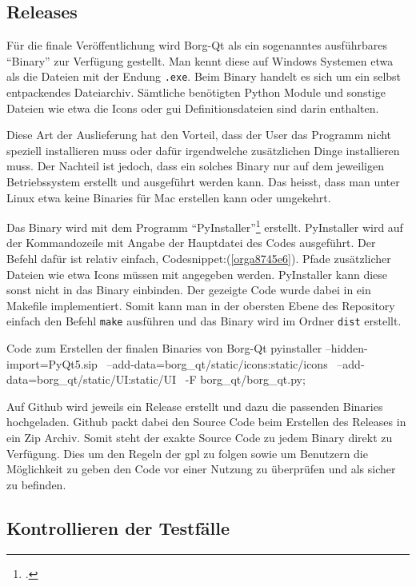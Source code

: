\newpage
\subsection{Releases}
\label{sec:org3adb3b3}

Für die finale Veröffentlichung wird Borg-Qt als ein sogenanntes ausführbares
"`Binary"' zur Verfügung gestellt. Man kennt diese auf Windows Systemen etwa als
die Dateien mit der Endung \texttt{.exe}. Beim Binary handelt es sich um ein selbst
entpackendes Dateiarchiv. Sämtliche benötigten Python Module und sonstige
Dateien wie etwa die Icons oder \gls{gui} Definitionsdateien sind darin
enthalten.

Diese Art der Auslieferung hat den Vorteil, dass der User das Programm nicht
speziell installieren muss oder dafür irgendwelche zusätzlichen Dinge
installieren muss. Der Nachteil ist jedoch, dass ein solches Binary nur auf dem
jeweiligen Betriebssystem erstellt und ausgeführt werden kann. Das heisst, dass
man unter Linux etwa keine Binaries für Mac erstellen kann oder umgekehrt.

Das Binary wird mit dem Programm "`PyInstaller"'\footcite{pyinstaller} erstellt.
PyInstaller wird auf der Kommandozeile mit Angabe der Hauptdatei des Codes
ausgeführt. Der Befehl dafür ist relativ einfach,
Codesnippet:(\ref{orga8745e6}). Pfade zusätzlicher Dateien wie etwa Icons
müssen mit angegeben werden. PyInstaller kann diese sonst nicht in das Binary
einbinden. Der gezeigte Code wurde dabei in ein Makefile implementiert. Somit
kann man in der obersten Ebene des Repository einfach den Befehl \texttt{make}
ausführen und das Binary wird im Ordner \texttt{dist} erstellt.

\begin{sexylisting}[label=orga8745e6]{Code zum Erstellen der finalen Binaries von Borg-Qt}
pyinstaller --hidden-import=PyQt5.sip \
    --add-data=borg_qt/static/icons:static/icons \
    --add-data=borg_qt/static/UI:static/UI \
    -F borg_qt/borg_qt.py; \
\end{sexylisting}
\newpage
Auf Github wird jeweils ein Release erstellt und dazu die passenden Binaries
hochgeladen. Github packt dabei den Source Code beim Erstellen des Releases in
ein Zip Archiv. Somit steht der exakte Source Code zu jedem Binary direkt zu
Verfügung. Dies um den Regeln der \gls{gpl} zu folgen sowie um Benutzern die
Möglichkeit zu geben den Code vor einer Nutzung zu überprüfen und als sicher zu
befinden.

\subsection{Kontrollieren der Testfälle}
\label{sec:orgc9c6334}

